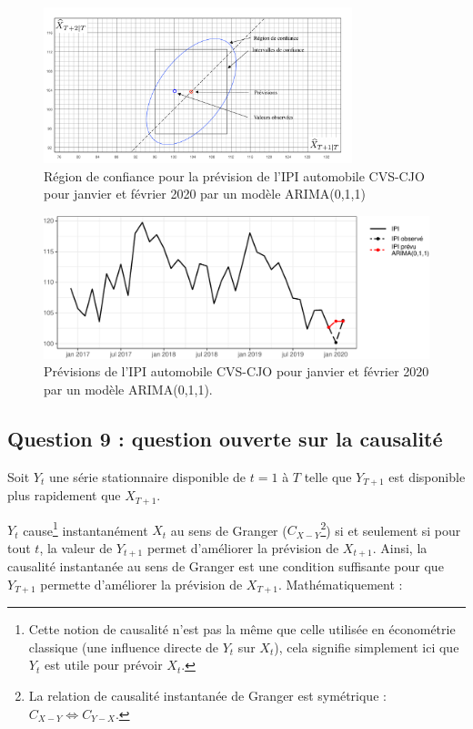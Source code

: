 \documentclass[french]{article}
\begin{document}
\begin{figure}[htbp]
\begin{center}\includegraphics[width = 0.8\textwidth]{img/ellipse} \end{center}
\captionsetup{margin=0cm,format=hang,justification=justified}
\caption{Région de confiance pour la prévision de l'IPI automobile CVS-CJO pour janvier et février 2020 par un modèle ARIMA(0,1,1)}\label{fig:RegIC}
\end{figure}

\begin{figure}

{\centering \includegraphics{img/rmd-prevIpi-1} 

}

\caption{Prévisions de l'IPI automobile CVS-CJO pour janvier et février 2020 par un modèle ARIMA(0,1,1).}\label{fig:prevIpi}
\end{figure}

\hypertarget{question-9-question-ouverte-sur-la-causalituxe9}{%
\subsection{Question 9 : question ouverte sur la causalité}\label{question-9-question-ouverte-sur-la-causalituxe9}}

Soit \(Y_t\) une série stationnaire disponible de \(t = 1\) à \(T\) telle que \(Y_{T+1}\) est disponible plus rapidement que \(X_{T+1}\).

\(Y_t\) cause\footnote{Cette notion de causalité n'est pas la même que celle utilisée en économétrie classique (une influence directe de \(Y_t\) sur \(X_t\)), cela signifie simplement ici que \(Y_t\) est utile pour prévoir \(X_t\).} instantanément \(X_t\) au sens de Granger (\(C_{X - Y}\)\footnote{La relation de causalité instantanée de Granger est symétrique : \(C_{X - Y} \iff C_{Y - X}\).}) si et seulement si pour tout \(t\), la valeur de \(Y_{t+1}\) permet d'améliorer la prévision de \(X_{t+1}\).
Ainsi, la causalité instantanée au sens de Granger est une condition suffisante pour que \(Y_{T+1}\) permette d'améliorer la prévision de \(X_{T+1}\).
Mathématiquement :
\end{document}
